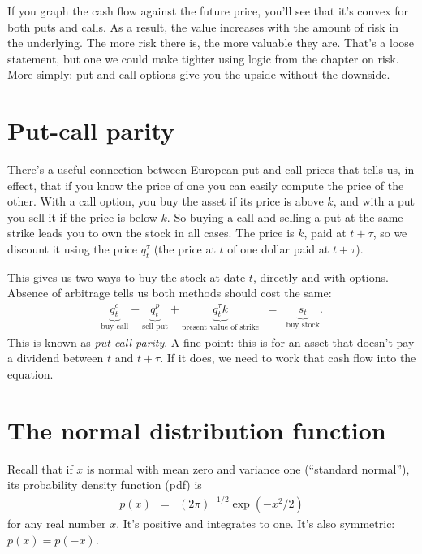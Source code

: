 \documentclass[11pt]{article}
\begin{document}
If you graph the cash flow against the future price, you'll see
that it's convex for both puts and calls.
As a result, the value increases with the amount
of risk in the underlying.
The more risk there is, the more valuable they are.
That's a loose statement, but one we could make tighter using  logic
from the chapter on risk.
More simply:  put and call options give you the upside
without the downside.


\section{Put-call parity}


There's a useful connection between European put and call prices
that tells us, in effect, that if you know the price of one you can
easily compute the price of the other.
With a call option, you buy the asset if its price is above $k$,
and with a put you sell it if the price is below $k$.
So buying a call and selling a put at the same strike leads you to own the stock in all cases.
The price is $k$, paid at $t+\tau$, so we discount it using
the price $q^\tau_t$ (the price at $t$ of one dollar paid at $t+\tau$).

This gives us two ways to buy the stock at date $t$,
directly and with options.
Absence of arbitrage tells us both methods should cost the same:
\begin{eqnarray}
    \underbrace{q^c_t}_{\mbox{buy call}} -
    \underbrace{q^p_t}_{\mbox{sell put}} +
    \underbrace{q^\tau_t k}_{\mbox{present value of strike}}
    &=&
    \underbrace{s_t}_{\mbox{buy stock}} .
    \label{eq:put-call-parity}
\end{eqnarray}
This is known as {\it put-call parity\/}.
A fine point:  this is for an asset that doesn't pay a dividend
between $t$ and $t+\tau$.
If it does, we need to work that cash flow into the equation.


\section{The normal distribution function}


Recall that if $x$ is normal with mean zero and variance one (``standard normal''),
its probability density function (pdf) is
\begin{eqnarray}
    p(x) &=& (2 \pi)^{-1/2} \exp(-x^2/2)
    \label{eq:pdf-stdnormal}
\end{eqnarray}
for any real number $x$.
It's positive and integrates to one.
It's also symmetric:  $p(x) = p(-x)$.
\end{document}
